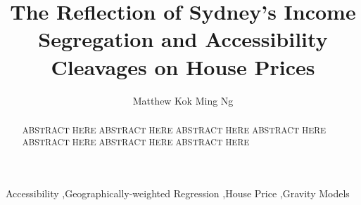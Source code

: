 \documentclass[preprint,review,12pt]{elsarticle}
\begin{document}
\begin{frontmatter}


\title{The Reflection of Sydney's Income Segregation and Accessibility Cleavages on House Prices}

\author[address1]{Matthew Kok Ming Ng}


\address[address1]{City Futures Research Centre \\ University of New South Wales}

\linenumbers

\begin{abstract} %
ABSTRACT HERE ABSTRACT HERE ABSTRACT HERE ABSTRACT HERE ABSTRACT HERE ABSTRACT HERE ABSTRACT HERE
\end{abstract}

\begin{keyword}
Accessibility \sep Geographically-weighted Regression \sep House Price \sep Gravity Models

\end{keyword}

\end{frontmatter}





\end{document}
